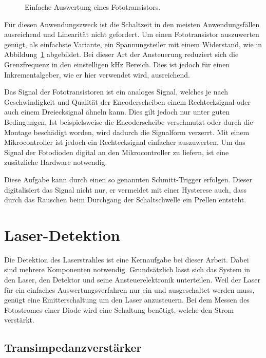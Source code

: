 \begin{figure} \centering
	\begin{minipage}[t]{.49\linewidth} \centering
		
	\end{minipage}
	\caption{Einfache Auswertung eines Fototransistors.}
	\label{img:FototransistorWithPullup}
\end{figure}

Für diesen Anwendungszweck ist die Schaltzeit in den meisten Anwendungsfällen ausreichend und Linearität nicht gefordert.
Um einen Fototransistor auszuwerten genügt, als einfachste Variante, ein Spannungsteiler mit einem Widerstand, wie in Abbildung~\ref{img:FototransistorWithPullup} abgebildet.
Bei dieser Art der Ansteuerung reduziert sich die Grenzfrequenz in den einstelligen kHz Bereich.
Dies ist jedoch für einen Inkrementalgeber, wie er hier verwendet wird, ausreichend.

Das Signal der Fototransistoren ist ein analoges Signal, welches je nach Geschwindigkeit und Qualität der Encoderscheiben einem Rechtecksignal oder auch einem Dreiecksignal ähneln kann.
Dies gilt jedoch nur unter guten Bedingungen.
Ist beispielsweise die Encoderscheibe verschmutzt oder durch die Montage beschädigt worden, wird dadurch die Signalform verzerrt.
Mit einem Mikrocontroller ist jedoch ein Rechtecksignal einfacher auszuwerten.
Um das Signal der Fotodioden digital an den Mikrocontroller zu liefern, ist eine zusätzliche Hardware notwendig.

Diese Aufgabe kann durch einen so genannten Schmitt-Trigger erfolgen.
Dieser digitalisiert das Signal nicht nur, er vermeidet mit einer Hysterese auch, dass durch das Rauschen beim Durchgang der Schaltschwelle ein Prellen entsteht. \cite[307]{book:elektrischeMesstechnik}

\section{Laser-Detektion}
Die Detektion des Laserstrahles ist eine Kernaufgabe bei dieser Arbeit.
Dabei sind mehrere Komponenten notwendig.
Grundsätzlich lässt sich das System in den Laser, den Detektor und seine Ansteuerelektronik unterteilen.
Weil der Laser für ein einfaches Auswertungsverfahren nur ein und ausgeschaltet werden muss, genügt eine Emitterschaltung um den Laser anzusteuern.
Bei dem Messen des Fotostromes einer Diode wird eine Schaltung benötigt, welche den Strom verstärkt.


\subsection{Transimpedanzverstärker}
\label{chap:elektronik:tia}

